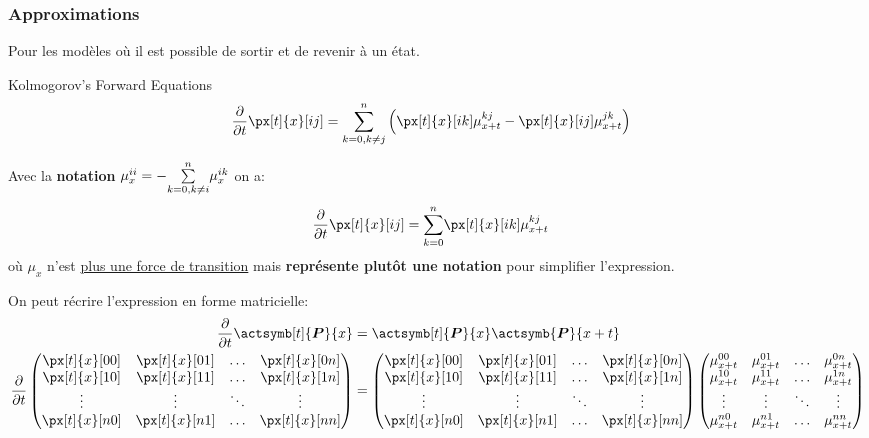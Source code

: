 \documentclass[10pt, french]{article}
\begin{document}
\begin{multicols*}{2}
\subsubsection*{Approximations}
Pour les modèles où il est possible de sortir et de revenir à un état.

\begin{conceptgen}{Kolmogorov's Forward Equations}
\begin{align*}
	\derivee{t}{} \px[t]{x}[ij]
	&=	\sumz{n}{k = 0, k \neq j} \left( \px[t]{x}[ik] \mu_{x + t}^{kj} - \px[t]{x}[ij] \mu_{x + t}^{jk}  \right)
\end{align*}

Avec la \textbf{notation} $\mu_{x}^{ii} = - \overset{n}{\underset{k = 0, k \neq i}{\sum}} \mu_{x}^{ik}$ on a:
\begin{align*}
	\derivee{t}{} \px[t]{x}[ij]
	&=	\sumz{n}{k = 0} \px[t]{x}[ik] \mu_{x + t}^{kj}
\end{align*}
où $\mu_{x}$ n'est \underline{plus une force de transition} mais \textbf{représente plutôt une notation} pour simplifier l'expression.
\end{conceptgen}

On peut récrire l'expression en forme matricielle:
	\setlength{\mathindent}{-1cm}
\begin{align*}
	\derivee{t}{} \actsymb[t]{\bm{P}}{x}
	&=	\actsymb[t]{\bm{P}}{x} \actsymb{\bm{P}}{x + t}	\\
	\derivee{t}{}
	\begin{pmatrix}
	\px[t]{x}[00]	&	\px[t]{x}[01]	&	\dots	&	\px[t]{x}[0n]	\\
	\px[t]{x}[10]	&	\px[t]{x}[11]	&	\dots	&	\px[t]{x}[1n]	\\
	\vdots			&	\vdots			&	\ddots	&	\vdots	\\
	\px[t]{x}[n0]	&	\px[t]{x}[n1]	&	\dots	&	\px[t]{x}[nn]	
	\end{pmatrix}
	&=	
	\begin{pmatrix}
	\px[t]{x}[00]	&	\px[t]{x}[01]	&	\dots	&	\px[t]{x}[0n]	\\
	\px[t]{x}[10]	&	\px[t]{x}[11]	&	\dots	&	\px[t]{x}[1n]	\\
	\vdots			&	\vdots			&	\ddots	&	\vdots	\\
	\px[t]{x}[n0]	&	\px[t]{x}[n1]	&	\dots	&	\px[t]{x}[nn]	
	\end{pmatrix}
	\begin{pmatrix}
	\mu_{x + t}^{00}	&	\mu_{x + t}^{01}	&	\dots	&	\mu_{x + t}^{0n}	\\
	\mu_{x + t}^{10}	&	\mu_{x + t}^{11}	&	\dots	&	\mu_{x + t}^{1n}	\\
	\vdots			&	\vdots			&	\ddots	&	\vdots	\\
	\mu_{x + t}^{n0}	&	\mu_{x + t}^{n1}	&	\dots	&	\mu_{x + t}^{nn}	
	\end{pmatrix}
\end{align*}
	\setlength{\mathindent}{1cm}
	

\end{multicols*}
\end{document}
